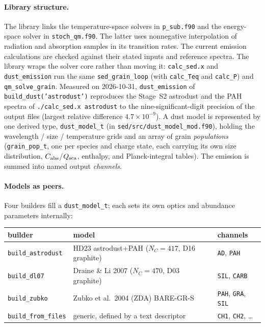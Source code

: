 \documentclass{my_memo}
\newcommand{\Cabs}{\ensuremath{C_{\rm abs}}}
\newcommand{\Qsca}{\ensuremath{Q_{\rm sca}}}
\begin{document}
\paragraph{Library structure.} The library links the temperature-space
solvers in \texttt{p\_sub.f90} and the energy-space solver in
\texttt{stoch\_qm.f90}. The latter uses nonnegative interpolation of
radiation and absorption samples in its transition rates. The current
emission calculations are checked against their stated inputs and
reference spectra. The library wraps the solver core rather than
moving it: \texttt{calc\_sed.x} and \texttt{dust\_emission} run the
same \texttt{sed\_grain\_loop} (with \texttt{calc\_Teq} and
\texttt{calc\_P}) and \texttt{qm\_solve\_grain}. Measured on
2026-10-31, \texttt{dust\_emission} of \texttt{build\_dust('astrodust')}
reproduces the Stage~S2 astrodust and the PAH spectra of
\texttt{./calc\_sed.x astrodust} to the nine-significant-digit
precision of the output files (largest relative difference
$4.7\times10^{-9}$). A dust model is represented by one
derived type, \texttt{dust\_model\_t} (in
\texttt{sed/src/dust\_model\_mod.f90}), holding the wavelength /
size / temperature grids and an array of grain \emph{populations}
(\texttt{grain\_pop\_t}, one per species and charge state, each carrying
its own size distribution, \Cabs/\Qsca, enthalpy, and Planck-integral
tables). The emission is summed into named output \emph{channels}.

\paragraph{Models as peers.} Four builders fill a \texttt{dust\_model\_t};
each sets its own optics and abundance parameters internally:

\begin{tabularx}{0.95\textwidth}{l l l}
\toprule
builder & model & channels \\
\midrule
\texttt{build\_astrodust}   & HD23 astrodust+PAH ($N_C{=}417$, D16 graphite) & \texttt{AD}, \texttt{PAH} \\
\texttt{build\_dl07}        & Draine \& Li 2007 ($N_C{=}470$, D03 graphite)  & \texttt{SIL}, \texttt{CARB} \\
\texttt{build\_zubko}       & Zubko et al.~2004 (ZDA) BARE-GR-S              & \texttt{PAH}, \texttt{GRA}, \texttt{SIL} \\
\texttt{build\_from\_files} & generic, defined by a text descriptor         & \texttt{CH1}, \texttt{CH2}, \ldots \\
\bottomrule
\end{tabularx}
\end{document}
